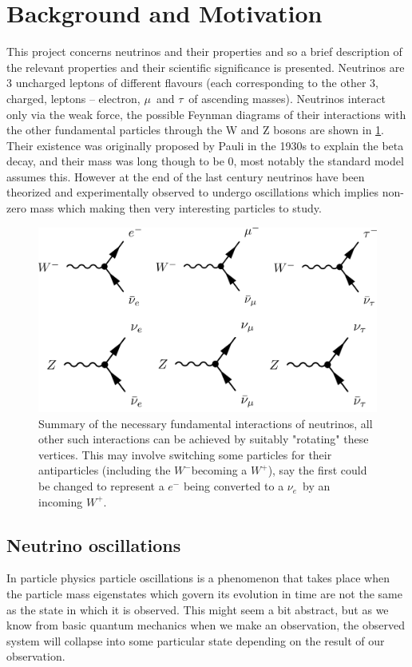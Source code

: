 \documentclass[a4paper,12pt]{article}
\newcommand{\Mu}{$\mu$}
\newcommand{\Tau}{$\tau$}
\newcommand{\Ne}{$\nu_e$}
\newcommand{\Wp}{$W^+$}
\newcommand{\Wm}{$W^-$}
\begin{document}
\section{Background and Motivation}
This project concerns neutrinos and their properties and so a brief description of the relevant properties and their scientific significance is presented.
Neutrinos are 3 uncharged leptons of different flavours (each corresponding to the other 3, charged, leptons -- electron, \Mu\ and \Tau\ of ascending masses).
Neutrinos interact only via the weak force, the possible Feynman diagrams of their interactions with the other fundamental particles through the W and Z bosons are shown in \cref{fig:nu_feyn}.
Their existence was originally proposed by Pauli in the 1930s to explain the beta decay, and their mass was long though to be 0, most notably the standard model assumes this.
However at the end of the last century neutrinos have been theorized and experimentally observed to undergo oscillations which implies non-zero mass which making then very interesting particles to study.

\begin{figure}[h]
    \centering
    \includegraphics{figures/NeutrinoFeynman.jpg}
    \caption{
        Summary of the necessary fundamental interactions of neutrinos, all other such interactions can be achieved by suitably "rotating" these vertices.
        This may involve switching some particles for their antiparticles (including the \Wm becoming a \Wp), say the first could be changed to represent a $e^-$ being converted to a \Ne\ by an incoming \Wp.
    }\label{fig:nu_feyn}
\end{figure}

\subsection{Neutrino oscillations}
In particle physics particle oscillations is a phenomenon that takes place when the particle mass eigenstates which govern its evolution in time are not the same as the state in which it is observed.
This might seem a bit abstract, but as we know from basic quantum mechanics when we make an observation, the observed system will collapse into some particular state depending on the result of our observation.
\end{document}
